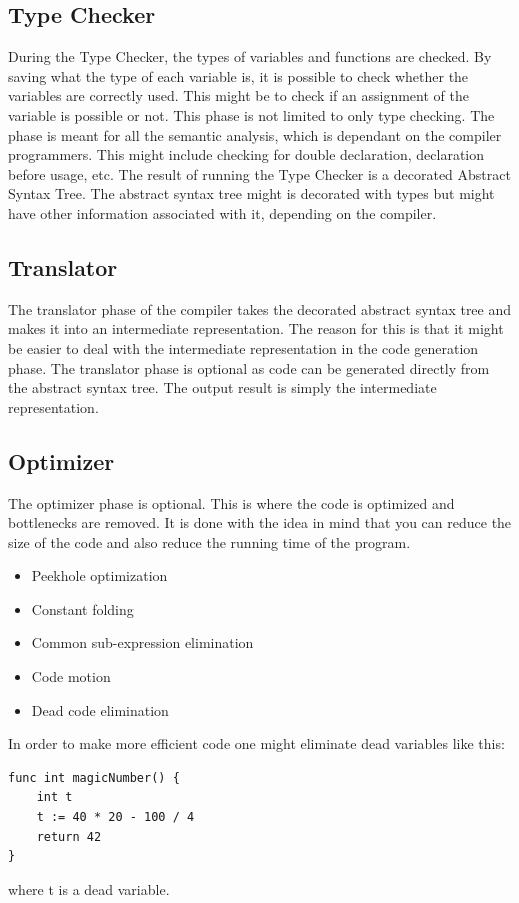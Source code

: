 \subsection{Type Checker}
During the Type Checker, the types of variables and functions are checked. By saving what the type of each variable is, it is possible to check whether the variables are correctly used. This might be to check if an assignment of the variable is possible or not. This phase is not limited to only type checking. The phase is meant for all the semantic analysis, which is dependant on the compiler programmers. This might include checking for double declaration, declaration before usage, etc.
The result of running the Type Checker is a decorated Abstract Syntax Tree. The abstract syntax tree might is decorated with types but might have other information associated with it, depending on the compiler.

\subsection{Translator}
The translator phase of the compiler takes the decorated abstract syntax tree and makes it into an intermediate representation. The reason for this is that it might be easier to deal with the intermediate representation in the code generation phase.
The translator phase is optional as code can be generated directly from the abstract syntax tree.
The output result is simply the intermediate representation.

\subsection{Optimizer}
The optimizer phase is optional. This is where the code is optimized and bottlenecks are removed. It is done with the idea in mind that you can reduce the size of the code and also reduce the running time of the program. 
\begin{itemize}
    \item Peekhole optimization
    \item Constant folding
    \item Common sub-expression elimination
    \item Code motion
    \item Dead code elimination
\end{itemize}{}

In order to make more efficient code one might eliminate dead variables like this:
\begin{verbatim}
func int magicNumber() {
    int t
    t := 40 * 20 - 100 / 4
    return 42
}
\end{verbatim}
where t is a dead variable.

